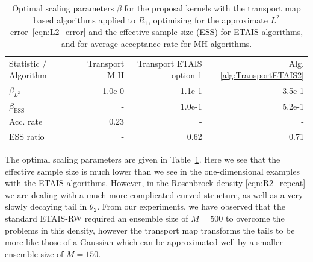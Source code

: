 \documentclass[final]{siamltex}
\newcommand{\edit}[1]{#1}
\begin{document}
\begin{table}[!ht]
\centering
\begin{tabular}{lrrr}
\toprule
	Statistic \quad / \quad Algorithm & Transport M-H &
                                                           Transport
                                                            ETAIS
                                                            option 1 & Alg. \ref{alg:TransportETAIS2}  \\ \cmidrule(lr){1-4}
	\edit{$\beta_{L^2}$}				 & 1.0e-0 & 1.1e-1 & 3.5e-1 \\
	\edit{$\beta_{\text{ESS}}$}				 & - & 1.0e-1 & 5.2e-1 \\ \cmidrule(lr){1-4}
	Acc. rate							 & 0.23 & - & - \\
	ESS ratio							 & - & 0.62 & 0.71 \\
\bottomrule
\end{tabular}
\caption{\edit{Optimal scaling parameters $\beta$ for the proposal
    kernels with the transport map based
  algorithms applied to $R_1$, optimising for the approximate
    $L^2$ error~\eqref{eqn:L2_error} and
  the effective sample size (ESS) for ETAIS algorithms, and for average
  acceptance rate for MH algorithms.}}
\label{tab:R2_opt_scaling}
\end{table}

The optimal scaling parameters are given in
Table~\ref{tab:R2_opt_scaling}. Here we see that the effective sample
size is much lower than we see in the one-dimensional examples with
the ETAIS algorithms. However, in the Rosenbrock density
\eqref{eqn:R2_repeat} we are dealing with a much more complicated
curved structure, as well as a very slowly decaying tail in
$\theta_2$. From our experiments, we have observed that the standard ETAIS-RW required an ensemble size of $M=500$ to overcome the problems in this density, however the transport map transforms the tails to be more like those of a Gaussian which can be approximated well by a smaller ensemble size of $M=150$.
\end{document}
